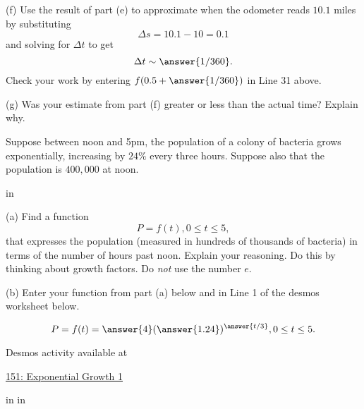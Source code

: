\documentclass{ximera}
\newcommand{\pskip}{\vskip 0.1 in}
\begin{document}
\begin{example}
\begin{question}
(f) Use the result of part (e) to approximate when the odometer reads $10.1$ miles by substituting 
\[
    \Delta s = 10.1 - 10  = 0.1
\]
and solving for $\Delta t$ to get
\[
     \Delta t \sim \answer{1/360} .
\]
Check your work by entering $f(0.5+\answer{1/360})$ in Line 31 above.

(g) Was your estimate from part (f) greater or less than the actual time? Explain why.


\end{question}
\end{example}


\begin{example} \label{Ex9d8gsd8}
Suppose between noon and 5pm, the population of a colony of bacteria grows exponentially, increasing by $24\%$ every three hours. Suppose also that the population is $400,000$ at noon.

\pskip

(a) Find a function
\[
       P = f(t) , 0\leq t \leq 5,
\]
that expresses the population (measured in hundreds of thousands of bacteria) in terms of the number of hours past noon. Explain your reasoning. Do this by thinking about growth factors. Do \emph{not} use the number $e$.
 
(b) Enter your function from part (a) below and in Line 1 of the desmos worksheet below.

\begin{question} \label{Qer45gh54}
\[
    P = f(t) = \answer{4}(\answer{1.24})^{\answer{t/3}} , 0\leq t \leq 5 .
\]


 
\begin{onlineOnly}
    \begin{center}
\end{center}
\end{onlineOnly}

Desmos activity available at

\href{https://www.desmos.com/calculator/aq5scwuxgj}{151: Exponential Growth 1}

\pskip \pskip




\end{question}


\end{example}
\end{document}
